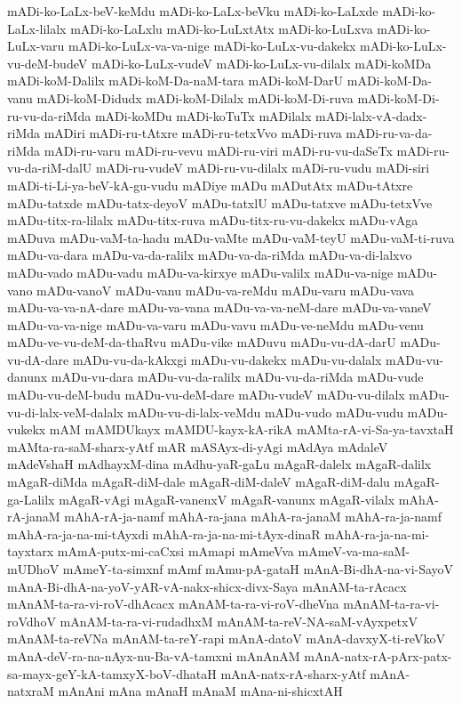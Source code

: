 {mADi-ko-LaLx-beV-keMdu
mADi-ko-LaLx-beVku
mADi-ko-LaLxde
mADi-ko-LaLx-lilalx
mADi-ko-LaLxlu
mADi-ko-LuLxtAtx
mADi-ko-LuLxva
mADi-ko-LuLx-varu
mADi-ko-LuLx-va-va-nige
mADi-ko-LuLx-vu-dakekx
mADi-ko-LuLx-vu-deM-budeV
mADi-ko-LuLx-vudeV
mADi-ko-LuLx-vu-dilalx
mADi-koMDa
mADi-koM-Dalilx
mADi-koM-Da-naM-tara
mADi-koM-DarU
mADi-koM-Da-vanu
mADi-koM-Didudx
mADi-koM-Dilalx
mADi-koM-Di-ruva
mADi-koM-Di-ru-vu-da-riMda
mADi-koMDu
mADi-koTuTx
mADilalx
mADi-lalx-vA-dadx-riMda
mADiri
mADi-ru-tAtxre
mADi-ru-tetxVvo
mADi-ruva
mADi-ru-va-da-riMda
mADi-ru-varu
mADi-ru-vevu
mADi-ru-viri
mADi-ru-vu-daSeTx
mADi-ru-vu-da-riM-dalU
mADi-ru-vudeV
mADi-ru-vu-dilalx
mADi-ru-vudu
mADi-siri
mADi-ti-Li-ya-beV-kA-gu-vudu
mADiye
mADu
mADutAtx
mADu-tAtxre
mADu-tatxde
mADu-tatx-deyoV
mADu-tatxlU
mADu-tatxve
mADu-tetxVve
mADu-titx-ra-lilalx
mADu-titx-ruva
mADu-titx-ru-vu-dakekx
mADu-vAga
mADuva
mADu-vaM-ta-hadu
mADu-vaMte
mADu-vaM-teyU
mADu-vaM-ti-ruva
mADu-va-dara
mADu-va-da-ralilx
mADu-va-da-riMda
mADu-va-di-lalxvo
mADu-vado
mADu-vadu
mADu-va-kirxye
mADu-valilx
mADu-va-nige
mADu-vano
mADu-vanoV
mADu-vanu
mADu-va-reMdu
mADu-varu
mADu-vava
mADu-va-va-nA-dare
mADu-va-vana
mADu-va-va-neM-dare
mADu-va-vaneV
mADu-va-va-nige
mADu-va-varu
mADu-vavu
mADu-ve-neMdu
mADu-venu
mADu-ve-vu-deM-da-thaRvu
mADu-vike
mADuvu
mADu-vu-dA-darU
mADu-vu-dA-dare
mADu-vu-da-kAkxgi
mADu-vu-dakekx
mADu-vu-dalalx
mADu-vu-danunx
mADu-vu-dara
mADu-vu-da-ralilx
mADu-vu-da-riMda
mADu-vude
mADu-vu-deM-budu
mADu-vu-deM-dare
mADu-vudeV
mADu-vu-dilalx
mADu-vu-di-lalx-veM-dalalx
mADu-vu-di-lalx-veMdu
mADu-vudo
mADu-vudu
mADu-vukekx
mAM
mAMDUkayx
mAMDU-kayx-kA-rikA
mAMta-rA-vi-Sa-ya-tavxtaH
mAMta-ra-saM-sharx-yAtf
mAR
mASAyx-di-yAgi
mAdAya
mAdaleV
mAdeVshaH
mAdhayxM-dina
mAdhu-yaR-gaLu
mAgaR-dalelx
mAgaR-dalilx
mAgaR-diMda
mAgaR-diM-dale
mAgaR-diM-daleV
mAgaR-diM-dalu
mAgaR-ga-Lalilx
mAgaR-vAgi
mAgaR-vanenxV
mAgaR-vanunx
mAgaR-vilalx
mAhA-rA-janaM
mAhA-rA-ja-namf
mAhA-ra-jana
mAhA-ra-janaM
mAhA-ra-ja-namf
mAhA-ra-ja-na-mi-tAyxdi
mAhA-ra-ja-na-mi-tAyx-dinaR
mAhA-ra-ja-na-mi-tayxtarx
mAmA-putx-mi-caCxsi
mAmapi
mAmeVva
mAmeV-va-ma-saM-mUDhoV
mAmeY-ta-simxnf
mAmf
mAmu-pA-gataH
mAnA-Bi-dhA-na-vi-SayoV
mAnA-Bi-dhA-na-yoV-yAR-vA-nakx-shicx-divx-Saya
mAnAM-ta-rAcacx
mAnAM-ta-ra-vi-roV-dhAcacx
mAnAM-ta-ra-vi-roV-dheVna
mAnAM-ta-ra-vi-roVdhoV
mAnAM-ta-ra-vi-rudadhxM
mAnAM-ta-reV-NA-saM-vAyxpetxV
mAnAM-ta-reVNa
mAnAM-ta-reY-rapi
mAnA-datoV
mAnA-davxyX-ti-reVkoV
mAnA-deV-ra-na-nAyx-nu-Ba-vA-tamxni
mAnAnAM
mAnA-natx-rA-pArx-patx-sa-mayx-geY-kA-tamxyX-boV-dhataH
mAnA-natx-rA-sharx-yAtf
mAnA-natxraM
mAnAni
mAna
mAnaH
mAnaM
mAna-ni-shicxtAH
}
